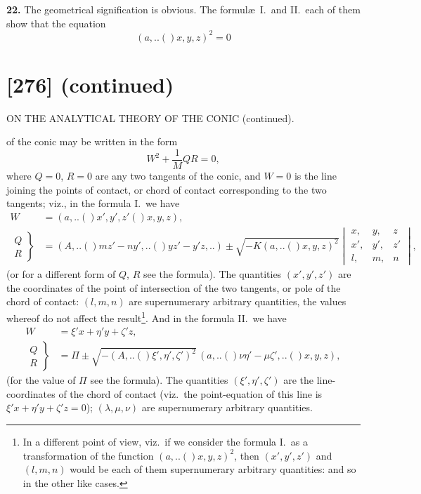 \documentclass[11pt,a4paper]{book}
\providecommand{\qform}[1]{(#1)}
\begin{document}
\textbf{22.} The geometrical signification is obvious. The formul\ae\ I.\ and II.\ each of them show that the equation
\[
(a,..\!\qform{}{x, y, z})^{2} = 0
\]

\newpage
\section*{[276] (continued)}
\begin{center}
{\large ON THE ANALYTICAL THEORY OF THE CONIC (continued).}
\end{center}

of the conic may be written in the form
\[
W^{2} + \frac{1}{M}QR = 0,
\]
where $Q = 0$, $R = 0$ are any two tangents of the conic, and $W = 0$ is the line joining the points of contact, or chord of contact corresponding to the two tangents; viz., in the formula I.\ we have
\begin{align*}
W &= (a,..\!\qform{}{x', y', z'}\!\qform{}{x, y, z}),\\
\left.\begin{array}{c} Q \\ R \end{array}\right\}
&= (A,..\!\qform{}{mz' - ny',..}\!\qform{}{yz' - y'z,..})
\pm \sqrt{-K(a,..\!\qform{}{x, y, z})^{2}}
\begin{vmatrix}
x, & y, & z \\
x', & y', & z' \\
l, & m, & n
\end{vmatrix},
\end{align*}
(or for a different form of $Q$, $R$ see the formula). The quantities $(x', y', z')$ are the coordinates of the point of intersection of the two tangents, or pole of the chord of contact: $(l, m, n)$ are supernumerary arbitrary quantities, the values whereof do not affect the result\footnote{In a different point of view, viz.\ if we consider the formula I.\ as a transformation of the function $(a,..\!\qform{}{x, y, z})^{2}$, then $(x', y', z')$ and $(l, m, n)$ would be each of them supernumerary arbitrary quantities: and so in the other like cases.}. And in the formula II.\ we have
\begin{align*}
W &= \xi'x + \eta'y + \zeta'z,\\
\left.\begin{array}{c} Q \\ R \end{array}\right\}
&= \Pi \pm \sqrt{-(A,..\!\qform{}{\xi', \eta', \zeta'})^{2}}\, (a,..\!\qform{}{\nu\eta' - \mu\zeta',..}\!\qform{}{x, y, z}),
\end{align*}
(for the value of $\Pi$ see the formula). The quantities $(\xi', \eta', \zeta')$ are the line-coordinates of the chord of contact (viz.\ the point-equation of this line is $\xi'x + \eta'y + \zeta'z = 0$); $(\lambda, \mu, \nu)$ are supernumerary arbitrary quantities.
\end{document}
